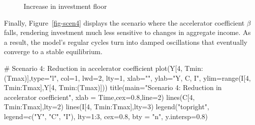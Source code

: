 \documentclass[
  letterpaper,
  DIV=11,
  numbers=noendperiod]{scrreprt}
\newenvironment{Shaded}{\begin{snugshade}}{\end{snugshade}}
\newcommand{\AttributeTok}[1]{\textcolor[rgb]{0.40,0.45,0.13}{#1}}
\newcommand{\CommentTok}[1]{\textcolor[rgb]{0.37,0.37,0.37}{#1}}
\newcommand{\DecValTok}[1]{\textcolor[rgb]{0.68,0.00,0.00}{#1}}
\newcommand{\FloatTok}[1]{\textcolor[rgb]{0.68,0.00,0.00}{#1}}
\newcommand{\FunctionTok}[1]{\textcolor[rgb]{0.28,0.35,0.67}{#1}}
\newcommand{\NormalTok}[1]{\textcolor[rgb]{0.00,0.23,0.31}{#1}}
\newcommand{\SpecialCharTok}[1]{\textcolor[rgb]{0.37,0.37,0.37}{#1}}
\newcommand{\StringTok}[1]{\textcolor[rgb]{0.13,0.47,0.30}{#1}}
\begin{document}
\begin{figure}[H]


\caption{\label{fig-scen3}Increase in investment floor}

\end{figure}%

Finally, Figure~\ref{fig-scen4} displays the scenario where the
accelerator coefficient \(\beta\) falls, rendering investment much less
sensitive to changes in aggregate income. As a result, the model's
regular cycles turn into damped oscillations that eventually converge to
a stable equilibrium.

\begin{Shaded}
\begin{Highlighting}[]
\CommentTok{\# Scenario 4: Reduction in accelerator coefficient}
\FunctionTok{plot}\NormalTok{(Y[}\DecValTok{4}\NormalTok{, Tmin}\SpecialCharTok{:}\NormalTok{(Tmax)],}\AttributeTok{type=}\StringTok{"l"}\NormalTok{, }\AttributeTok{col=}\DecValTok{1}\NormalTok{, }\AttributeTok{lwd=}\DecValTok{2}\NormalTok{, }\AttributeTok{lty=}\DecValTok{1}\NormalTok{, }\AttributeTok{xlab=}\StringTok{""}\NormalTok{, }\AttributeTok{ylab=}\StringTok{"Y, C, I"}\NormalTok{, }\AttributeTok{ylim=}\FunctionTok{range}\NormalTok{(I[}\DecValTok{4}\NormalTok{, Tmin}\SpecialCharTok{:}\NormalTok{Tmax],Y[}\DecValTok{4}\NormalTok{, Tmin}\SpecialCharTok{:}\NormalTok{(Tmax)]))}
\FunctionTok{title}\NormalTok{(}\AttributeTok{main=}\StringTok{"Scenario 4: Reduction in accelerator coefficient"}\NormalTok{, }\AttributeTok{xlab =} \StringTok{\textquotesingle{}Time\textquotesingle{}}\NormalTok{,}\AttributeTok{cex=}\FloatTok{0.8}\NormalTok{,}\AttributeTok{line=}\DecValTok{2}\NormalTok{)}
\FunctionTok{lines}\NormalTok{(C[}\DecValTok{4}\NormalTok{, Tmin}\SpecialCharTok{:}\NormalTok{Tmax],}\AttributeTok{lty=}\DecValTok{2}\NormalTok{)}
\FunctionTok{lines}\NormalTok{(I[}\DecValTok{4}\NormalTok{, Tmin}\SpecialCharTok{:}\NormalTok{Tmax],}\AttributeTok{lty=}\DecValTok{3}\NormalTok{)}
\FunctionTok{legend}\NormalTok{(}\StringTok{"topright"}\NormalTok{, }\AttributeTok{legend=}\FunctionTok{c}\NormalTok{(}\StringTok{"Y"}\NormalTok{, }\StringTok{"C"}\NormalTok{, }\StringTok{"I"}\NormalTok{),}
       \AttributeTok{lty=}\DecValTok{1}\SpecialCharTok{:}\DecValTok{3}\NormalTok{, }\AttributeTok{cex=}\FloatTok{0.8}\NormalTok{, }\AttributeTok{bty =} \StringTok{"n"}\NormalTok{, }\AttributeTok{y.intersp=}\FloatTok{0.8}\NormalTok{)}
\end{Highlighting}
\end{Shaded}
\end{document}
